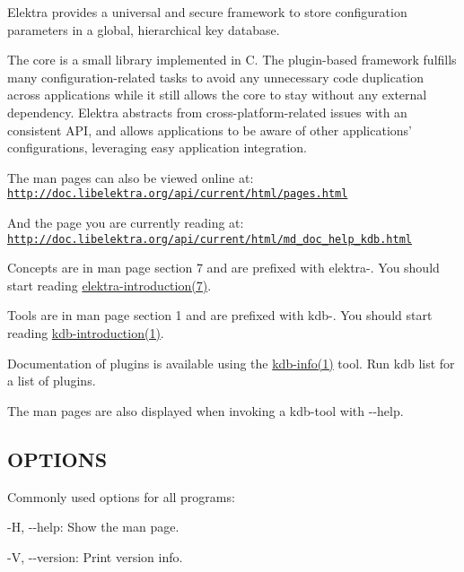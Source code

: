 Elektra provides a universal and secure framework to store configuration parameters in a global, hierarchical key database.

The core is a small library implemented in C. The plugin-\/based framework fulfills many configuration-\/related tasks to avoid any unnecessary code duplication across applications while it still allows the core to stay without any external dependency. Elektra abstracts from cross-\/platform-\/related issues with an consistent A\+P\+I, and allows applications to be aware of other applications' configurations, leveraging easy application integration.

The man pages can also be viewed online at\+: \href{http://doc.libelektra.org/api/current/html/pages.html}{\tt http\+://doc.\+libelektra.\+org/api/current/html/pages.\+html}

And the page you are currently reading at\+: \href{http://doc.libelektra.org/api/current/html/md_doc_help_kdb.html}{\tt http\+://doc.\+libelektra.\+org/api/current/html/md\+\_\+doc\+\_\+help\+\_\+kdb.\+html}

Concepts are in man page section 7 and are prefixed with {\ttfamily elektra-\/}. You should start reading \hyperlink{md_doc_help_elektra-introduction_doc_help_elektra-introduction_md}{elektra-\/introduction(7)}.

Tools are in man page section 1 and are prefixed with {\ttfamily kdb-\/}. You should start reading \hyperlink{doc_help_kdb-introduction_md}{kdb-\/introduction(1)}.

Documentation of plugins is available using the \hyperlink{md_doc_help_kdb-info_doc_help_kdb-info_md}{kdb-\/info(1)} tool. Run {\ttfamily kdb list} for a list of plugins.

The man pages are also displayed when invoking a kdb-\/tool with {\ttfamily -\/-\/help}.

\subsection*{O\+P\+T\+I\+O\+N\+S}

Commonly used options for all programs\+:


\begin{DoxyItemize}
\item {\ttfamily -\/\+H}, {\ttfamily -\/-\/help}\+: Show the man page.
\item {\ttfamily -\/\+V}, {\ttfamily -\/-\/version}\+: Print version info. 
\end{DoxyItemize}